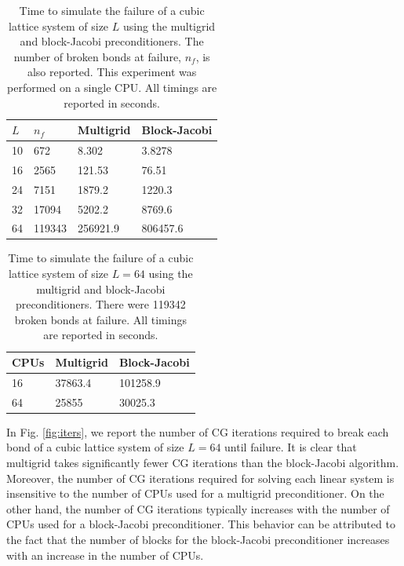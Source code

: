 \documentclass[11pt]{iopart}
\begin{document}
\begin{table}
  \centering
  \caption{\label{tab:seqFull} Time to simulate the failure of a cubic lattice system of size $L$ using 
  the multigrid and block-Jacobi preconditioners. The number of broken bonds at failure, $n_f$, is also reported. 
  This experiment was performed on a single CPU. All timings are reported in seconds.}
  \begin{tabular}{|l|l|l|l|} \hline  
  $L$	& $n_f$ & Multigrid &	Block-Jacobi \\ \hline
10 & 672 & 8.302	& 3.8278 \\
16 & 2565 & 121.53	& 76.51 \\
24 & 7151 & 1879.2	& 1220.3 \\
32 & 17094 & 5202.2	& 8769.6 \\ 
64 & 119343 & 256921.9 & 806457.6 \\ \hline
 \end{tabular}    
 \end{table}

\begin{table}
  \centering
  \caption{\label{tab:prlFull} Time to simulate the failure of a cubic lattice system of size $L = 64$ using 
  the multigrid and block-Jacobi preconditioners. There were 119342 broken bonds at failure. 
   All timings are reported in seconds.}
  \begin{tabular}{|l|l|l|} \hline  
  CPUs	& Multigrid &	Block-Jacobi \\ \hline  
  16 & 37863.4 & 101258.9 \\ 
  64 & 25855 & 30025.3 \\ \hline	
 \end{tabular}    
\end{table}

In Fig. \ref{fig:iters}, we report the number of CG iterations required to break each bond of a cubic lattice system of size $L = 64$ until failure.
It is clear that multigrid takes significantly fewer CG iterations than the block-Jacobi algorithm. Moreover, the number of CG iterations required for 
solving each linear system is insensitive to the number of CPUs used for a multigrid preconditioner. On the other hand, the number of
 CG iterations typically increases with the number of CPUs used for a block-Jacobi preconditioner. 
This behavior can be attributed to the fact that the number of blocks for the block-Jacobi preconditioner increases
 with an increase in the number of CPUs.
 
\end{document}

